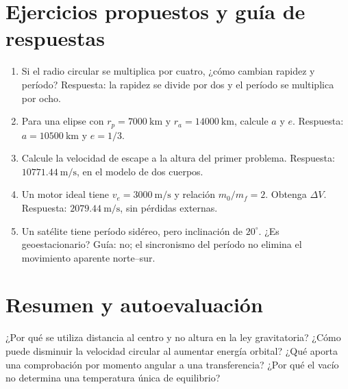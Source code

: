 \section{Ejercicios propuestos y guía de respuestas}
\begin{enumerate}
\item Si el radio circular se multiplica por cuatro, ¿cómo cambian rapidez y período? Respuesta: la rapidez se divide por dos y el período se multiplica por ocho.
\item Para una elipse con $r_p=7000\ \mathrm{km}$ y $r_a=14000\ \mathrm{km}$, calcule $a$ y $e$. Respuesta: $a=10500\ \mathrm{km}$ y $e=1/3$.
\item Calcule la velocidad de escape a la altura del primer problema. Respuesta: $10771.44\ \mathrm{m/s}$, en el modelo de dos cuerpos.
\item Un motor ideal tiene $v_e=3000\ \mathrm{m/s}$ y relación $m_0/m_f=2$. Obtenga $\Delta V$. Respuesta: $2079.44\ \mathrm{m/s}$, sin pérdidas externas.
\item Un satélite tiene período sidéreo, pero inclinación de $20^\circ$. ¿Es geoestacionario? Guía: no; el sincronismo del período no elimina el movimiento aparente norte--sur.
\end{enumerate}
\section{Resumen y autoevaluación}
¿Por qué se utiliza distancia al centro y no altura en la ley gravitatoria? ¿Cómo puede disminuir la velocidad circular al aumentar energía orbital? ¿Qué aporta una comprobación por momento angular a una transferencia? ¿Por qué el vacío no determina una temperatura única de equilibrio?
